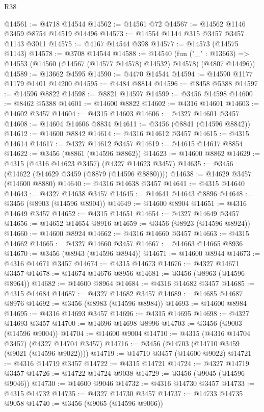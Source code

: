 \begin{lexlean}{R38}
\begin{coremodule}
@14561 := @4718 @14544
@14562 := @14561 @72
@14567 := @14562 @1146 @3459 @8754 @14519 @14496
@14573 := @14554 @1144 @315 @3457 @3457 @1143 @3011
@14575 := @4167 @14544 @398
@14577 := @14573 (@14575 @1143)
@14578 := @3708 @14544
@14588 := @14540
    (fun ("_" : @13663) => @14553 (@14560 (@14567 (@14577 @14578) @14532) @14578) (@4807 @14496))
@14589 := @13662 @4595
@14590 := @4470 @14544
@14594 := @14590 @1177 @1179 @1401 @14200
@14595 := @4484 @8814
@14596 := @8458 @5388
@14597 := @14596 @8822
@14598 := @8821 @14597
@14599 := @3456 @14598
@14600 := @8462 @5388
@14601 := @14600 @8822
@14602 := @4316 @14601
@14603 := @14602 @3457
@14604 := @4315 @14603
@14606 := @4327 @14601 @3457
@14608 := @14604 @14606 @8834
@14611 := @3456 (@8841 (@14596 @8842))
@14612 := @14600 @8842
@14614 := @4316 @14612 @3457
@14615 := @4315 @14614
@14617 := @4327 @14612 @3457
@14619 := @14615 @14617 @8854
@14622 := @3456 (@8861 (@14596 @8862))
@14623 := @14600 @8862
@14629 := @4315 (@4316 @14623 @3457) (@4327 @14623 @3457)
@14635 := @3456 (@14622 (@14629 @3459 (@8879 (@14596 @8880))))
@14638 := @14629 @3457 (@14600 @8880)
@14640 := @4316 @14638 @3457
@14641 := @4315 @14640
@14643 := @4327 @14638 @3457
@14645 := @14641 @14643 @8896
@14648 := @3456 (@8903 (@14596 @8904))
@14649 := @14600 @8904
@14651 := @4316 @14649 @3457
@14652 := @4315 @14651
@14654 := @4327 @14649 @3457
@14656 := @14652 @14654 @8916
@14659 := @3456 (@8923 (@14596 @8924))
@14660 := @14600 @8924
@14662 := @4316 @14660 @3457
@14663 := @4315 @14662
@14665 := @4327 @14660 @3457
@14667 := @14663 @14665 @8936
@14670 := @3456 (@8943 (@14596 @8944))
@14671 := @14600 @8944
@14673 := @4316 @14671 @3457
@14674 := @4315 @14673
@14676 := @4327 @14671 @3457
@14678 := @14674 @14676 @8956
@14681 := @3456 (@8963 (@14596 @8964))
@14682 := @14600 @8964
@14684 := @4316 @14682 @3457
@14685 := @4315 @14684
@14687 := @4327 @14682 @3457
@14689 := @14685 @14687 @8976
@14692 := @3456 (@8983 (@14596 @8984))
@14693 := @14600 @8984
@14695 := @4316 @14693 @3457
@14696 := @4315 @14695
@14698 := @4327 @14693 @3457
@14700 := @14696 @14698 @8996
@14703 := @3456 (@9003 (@14596 @9004))
@14704 := @14600 @9004
@14710 := @4315 (@4316 @14704 @3457) (@4327 @14704 @3457)
@14716 := @3456 (@14703 (@14710 @3459 (@9021 (@14596 @9022))))
@14719 := @14710 @3457 (@14600 @9022)
@14721 := @4316 @14719 @3457
@14722 := @4315 @14721
@14724 := @4327 @14719 @3457
@14726 := @14722 @14724 @9038
@14729 := @3456 (@9045 (@14596 @9046))
@14730 := @14600 @9046
@14732 := @4316 @14730 @3457
@14733 := @4315 @14732
@14735 := @4327 @14730 @3457
@14737 := @14733 @14735 @9058
@14740 := @3456 (@9065 (@14596 @9066))

\end{coremodule}
\end{lexlean}
